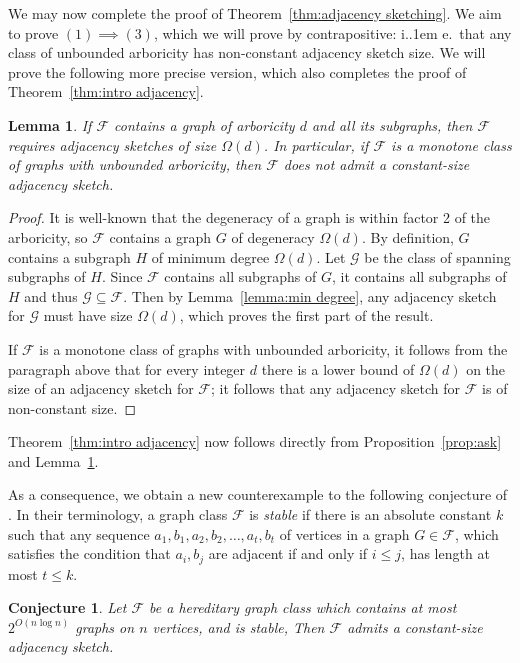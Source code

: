 \documentclass[11pt]{article}
\newcommand*\ie{i.\kern.1em e.\ }
\newtheorem{lemma}[thm]{Lemma}
\newtheorem{conj}[thm]{Conjecture}
\theoremstyle{definition}
\newcommand{\G}{\mathcal{G}}
\renewcommand{\leq}{\leqslant}
\def\F {{\mathcal F}}
\def\G {{\mathcal G}}
\begin{document}
\noindent
We may now complete the proof of Theorem~\ref{thm:adjacency sketching}. We aim to prove $(1)
\implies (3)$, which we will prove by contrapositive: \ie that any class of unbounded arboricity
has non-constant adjacency sketch size. We will prove the following
more precise version, which also completes the proof of Theorem~\ref{thm:intro adjacency}.
\begin{lemma}\label{lem:ask}
  If $\F$ contains a graph of arboricity $d$ and all its subgraphs, then $\F$ requires adjacency sketches of size
  $\Omega(d)$. In particular, if $\F$ is a monotone class of graphs with
  unbounded arboricity, then $\F$ does not admit a
constant-size adjacency sketch.
\end{lemma}
\begin{proof}
It is well-known that the degeneracy of a graph is within factor 2 of
the arboricity, so $\F$ contains a graph $G$ of degeneracy
$\Omega(d)$. By definition, $G$ contains a subgraph $H$ of minimum
degree $\Omega(d)$. Let $\G$ be the class of spanning subgraphs of
$H$. Since $\F$ contains all subgraphs of $G$, it contains all
subgraphs of $H$ and thus $\G \subseteq \F$. Then by Lemma~\ref{lemma:min degree}, any adjacency sketch for $\G$ must
have size $\Omega(d)$, which proves the first part of the result.

If $\F$ is a monotone class of graphs with
  unbounded arboricity, it follows from the paragraph above that for every integer $d$ there is a lower bound of
$\Omega(d)$ on the size of an adjacency sketch for $\F$; it
follows that any adjacency sketch for $\F$ is
of non-constant size.
\end{proof}

Theorem~\ref{thm:intro adjacency} now follows directly from Proposition~\ref{prop:ask} and Lemma~\ref{lem:ask}.

\noindent
As a consequence, we obtain a new counterexample to the following conjecture of \cite{HWZ21}. In
their terminology, a graph class $\F$ is \emph{stable} if there is an absolute constant $k$ such
that any sequence $a_1, b_1, a_2, b_2, \dotsc, a_t, b_t$ of vertices in a graph $G \in \F$, which
satisfies the condition that $a_i, b_j$ are adjacent if and only if $i \leq j$, has length at most
$t \leq k$.

\begin{conj}
\label{conj:hwz}
Let $\F$ be a hereditary graph class which contains at most $2^{O(n \log n)}$
graphs on $n$ vertices, and is stable, Then $\F$ admits a constant-size adjacency sketch.
\end{conj}
\end{document}
